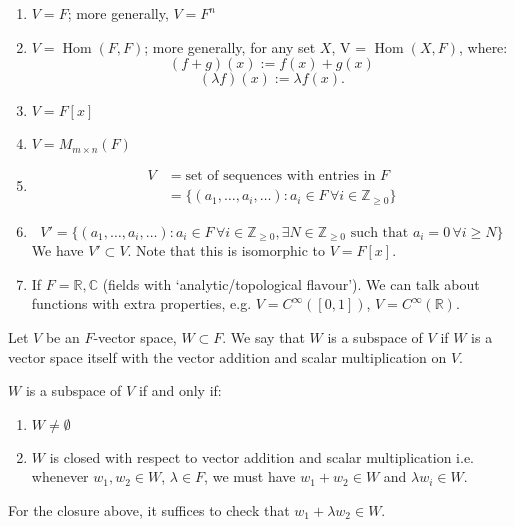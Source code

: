 \documentclass{scrartcl}
\def\ge{\geqslant}
\def\Z{\mathbb{Z}}
\def\R{\mathbb{R}}
\def\C{\mathbb{C}}
\DeclareMathOperator{\Hom}{Hom}
\begin{document}
\begin{example}
	\begin{enumerate}
		\item $V=F$; more generally, $V=F^n$
		\item $V = \Hom(F, F)$; more generally, for any set $X$, V = $\Hom(X, F)$, where:
		\[(f+g)(x) := f(x) + g(x)\]
		\[(\lambda f)(x) := \lambda f(x).\]
		\item $V=F[x]$
		\item $V=M_{m \times n}(F)$
		\item \begin{align*}
			V &= \text{set of sequences with entries in $F$} \\
			&= \{(a_1, \dots, a_i, \dots): a_i \in F \,\forall i\in \Z_{\ge 0}\}
		\end{align*}
		\item \[V' = \{(a_1, \dots, a_i, \dots): a_i \in F \,\forall i\in \Z_{\ge 0}, \exists N \in \Z_{\ge 0} \text{ such that } a_i=0 \,\forall i \ge N\}\]
		We have $V' \subset V$. Note that this is isomorphic to $V=F[x]$.
		\item If $F = \R, \C$ (fields with `analytic/topological flavour'). We can talk about functions with extra properties, e.g. $V=C^\infty([0, 1])$, $V=C^\infty(\R)$. 
	\end{enumerate}
\end{example}
\begin{definition}
	Let $V$ be an $F$-vector space, $W \subset F$. We say that $W$ is a subspace of $V$ if $W$ is a vector space itself with the vector addition and scalar multiplication on $V$. 
\end{definition}
\begin{proposition}
	$W$ is a subspace of $V$ if and only if: 
	\begin{enumerate}
		\item $W \ne \emptyset$
		\item $W$ is closed with respect to vector addition and scalar multiplication i.e. whenever $w_1, w_2 \in W$, $\lambda \in F$, we must have $w_1+w_2 \in W$ and $\lambda w_i \in W$.  
	\end{enumerate}
\end{proposition}
\begin{remark}
	For the closure above, it suffices to check that $w_1+\lambda w_2 \in W$.
\end{remark}
\end{document}
